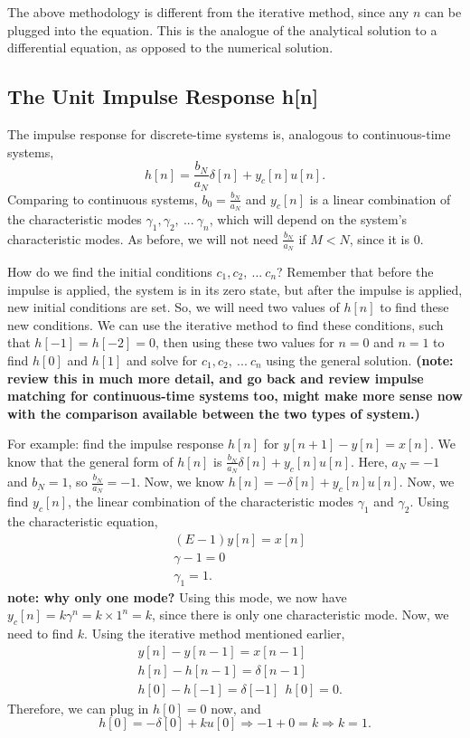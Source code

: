 \documentclass{article}
\begin{document}
The above methodology is different from the iterative method, since any \(n\) can be plugged into the equation. This is the analogue of the analytical solution to a differential equation, as opposed to the numerical solution.

\subsection{The Unit Impulse Response h[n]}

The impulse response for discrete-time systems is, analogous to continuous-time systems, 
\[
	h[n] = \frac{b_N}{a_N}\delta[n]+ y_c[n]u[n].
\]
Comparing to continuous systems, \(b_0 = \frac{b_N}{a_N}\) and \(y_c[n]\) is a linear combination of the characteristic modes \(\gamma_1, \gamma_2, \ ... \ \gamma_n\), which will depend on the system's characteristic modes. As before, we will not need \(\frac{b_N}{a_N}\) if \(M < N\), since it is 0.

How do we find the initial conditions \(c_1, c_2, \ ... \ c_n\)? Remember that before the impulse is applied, the system is in its zero state, but after the impulse is applied, new initial conditions are set. So, we will need two values of \(h[n]\) to find these new conditions. We can use the iterative method to find these conditions, such that \(h[-1] = h[-2] = 0\), then using these two values for \(n=0\) and \(n=1\) to find \(h[0]\) and \(h[1]\) and solve for \(c_1, c_2, \ ... \ c_n\) using the general solution. \textbf{(note: review this in much more detail, and go back and review impulse matching for continuous-time systems too, might make more sense now with the comparison available between the two types of system.)}

For example: find the impulse response \(h[n]\) for \(y[n+1] - y[n] = x[n]\). We know that the general form of \(h[n]\) is \(\frac{b_N}{a_N}\delta[n] + y_c[n]u[n]\). Here, \(a_N = -1\) and \(b_N = 1\), so \(\frac{b_N}{a_N} = -1\). Now, we know \(h[n] = -\delta[n] + y_c[n]u[n]\). Now, we find \(y_c[n]\), the linear combination of the characteristic modes \(\gamma_1\) and \(\gamma_2\). Using the characteristic equation, 
\begin{align*}
	&(E-1)y[n] = x[n] \\
	&\gamma - 1 = 0 \\
	&\gamma_1 = 1.
\end{align*}
\textbf{note: why only one mode?}
Using this mode, we now have \(y_c[n] = k\gamma^n = k \times 1^n = k\), since there is only one characteristic mode. Now, we need to find \(k\). Using the iterative method mentioned earlier, 
\begin{align*}
	&y[n] - y[n-1] = x[n-1] \\
	&h[n] - h[n-1] = \delta[n-1] \\
	&h[0] - h[-1] = \delta[-1] \ \ h[0] = 0.
\end{align*}
Therefore, we can plug in \(h[0] = 0\) now, and 
\[
	h[0] = -\delta[0] + ku[0] \Rightarrow -1 + 0 = k \Rightarrow k = 1.
\]
\end{document}
